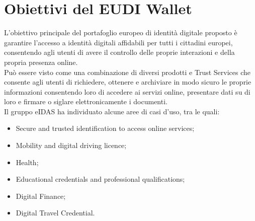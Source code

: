 \section{Obiettivi del EUDI Wallet}
L'obiettivo principale del portafoglio europeo di identità digitale proposto è garantire l'accesso a identità digitali affidabili per tutti i cittadini europei, consentendo agli utenti di avere il controllo delle proprie interazioni e della propria presenza online.\\
Può essere visto come una combinazione di diversi prodotti e Trust Services che consente agli utenti di richiedere, ottenere e archiviare in modo sicuro le proprie informazioni consentendo loro di accedere ai servizi online, presentare dati su di loro e firmare o siglare elettronicamente i documenti.\\
Il gruppo eIDAS ha individuato alcune aree di casi d'uso, tra le quali:
\begin{itemize}
    \item Secure and trusted identification to access online services;
    \item Mobility and digital driving licence;
    \item Health;
    \item Educational credentials and professional qualifications;
    \item Digital Finance;
    \item Digital Travel Credential.
\end{itemize}
